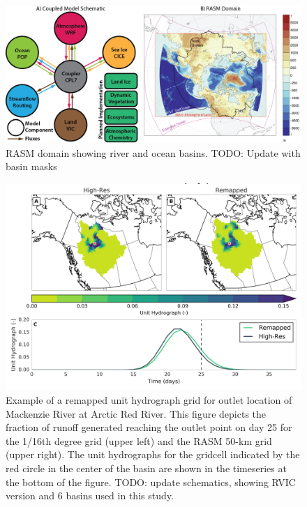 \documentclass[jgrga, draft]{agutex}
\begin{document}
%
%
%
%

\clearpage
\begin{figure}
\noindent\includegraphics[width=40pc,natwidth=1]{rasm_schematic_domain}
\caption{RASM domain showing river and ocean basins. TODO: Update with basin masks}
\label{fig:rasm_schematic_domain}
\end{figure}

\clearpage
\begin{figure}
\noindent\includegraphics[width=40pc,natwidth=1]{uh_remap_schematic}
\caption{Example of a remapped unit hydrograph grid for outlet location of Mackenzie River at Arctic Red River. This figure depicts the fraction of runoff generated reaching the outlet point on day 25 for the 1/16th degree grid (upper left) and the RASM 50-km grid (upper right). The unit hydrographs for the gridcell indicated by the red circle in the center of the basin are shown in the timeseries at the bottom of the figure. TODO: update schematics, showing RVIC version and 6 basins used in this study.}
\label{fig:uh_remap_schematic}
\end{figure}
\end{document}
